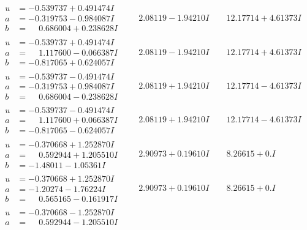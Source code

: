 \documentclass[1p]{elsarticle_modified}
\theoremstyle{definition}
\begin{document}
$$\begin{array}{c|c|c}
\begin{aligned}
u &= -0.539737 + 0.491474 I \\
a &= -0.319753 - 0.984087 I \\
b &= \phantom{-}0.686004 + 0.238628 I\end{aligned}
 & \phantom{-}2.08119 - 1.94210 I & \phantom{-}12.17714 + 4.61373 I \\ \hline\begin{aligned}
u &= -0.539737 + 0.491474 I \\
a &= \phantom{-}1.117600 - 0.066387 I \\
b &= -0.817065 + 0.624057 I\end{aligned}
 & \phantom{-}2.08119 - 1.94210 I & \phantom{-}12.17714 + 4.61373 I \\ \hline\begin{aligned}
u &= -0.539737 - 0.491474 I \\
a &= -0.319753 + 0.984087 I \\
b &= \phantom{-}0.686004 - 0.238628 I\end{aligned}
 & \phantom{-}2.08119 + 1.94210 I & \phantom{-}12.17714 - 4.61373 I \\ \hline\begin{aligned}
u &= -0.539737 - 0.491474 I \\
a &= \phantom{-}1.117600 + 0.066387 I \\
b &= -0.817065 - 0.624057 I\end{aligned}
 & \phantom{-}2.08119 + 1.94210 I & \phantom{-}12.17714 - 4.61373 I \\ \hline\begin{aligned}
u &= -0.370668 + 1.252870 I \\
a &= \phantom{-}0.592944 + 1.205510 I \\
b &= -1.48011 - 1.05361 I\end{aligned}
 & \phantom{-}2.90973 + 0.19610 I & \phantom{-}8.26615 + 0. I\phantom{ +0.000000I} \\ \hline\begin{aligned}
u &= -0.370668 + 1.252870 I \\
a &= -1.20274 - 1.76224 I \\
b &= \phantom{-}0.565165 - 0.161917 I\end{aligned}
 & \phantom{-}2.90973 + 0.19610 I & \phantom{-}8.26615 + 0. I\phantom{ +0.000000I} \\ \hline\begin{aligned}
u &= -0.370668 - 1.252870 I \\
a &= \phantom{-}0.592944 - 1.205510 I \\

\end{aligned}
\end{array}$$
\end{document}
